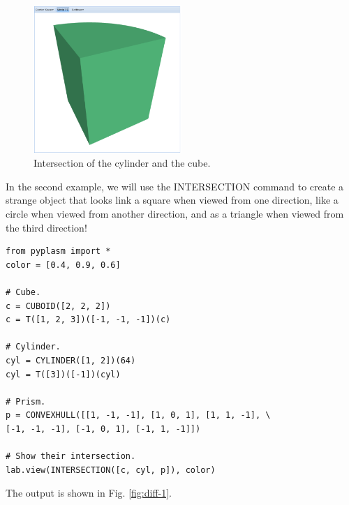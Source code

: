 \documentclass[article,A4,12pt]{llncs}
\begin{document}
\begin{figure}[!ht]
\begin{center}
\includegraphics[width=0.5\textwidth]{img/int-2.png}
\end{center}
\vspace{-2mm}
\caption{Intersection of the cylinder and the cube.}
\label{fig:int-2}
\end{figure}
\noindent
In the second example, we will use the INTERSECTION command to create 
a strange object that looks link a square when viewed
from one direction, like a circle when viewed from another direction, 
and as a triangle when viewed from the third direction!


\begin{verbatim}
from pyplasm import *
color = [0.4, 0.9, 0.6]

# Cube.
c = CUBOID([2, 2, 2])
c = T([1, 2, 3])([-1, -1, -1])(c)

# Cylinder.
cyl = CYLINDER([1, 2])(64)
cyl = T([3])([-1])(cyl)

# Prism.
p = CONVEXHULL([[1, -1, -1], [1, 0, 1], [1, 1, -1], \
[-1, -1, -1], [-1, 0, 1], [-1, 1, -1]])

# Show their intersection.
lab.view(INTERSECTION([c, cyl, p]), color)
\end{verbatim}
The output is shown in Fig. \ref{fig:diff-1}.
\end{document}
